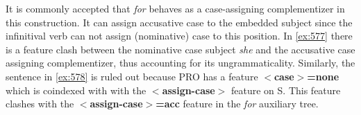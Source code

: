 It is commonly accepted that {\it for\/} behaves as a case-assigning 
complementizer in this construction. It can assign accusative case to the 
embedded subject since the infinitival verb can not assign 
(nominative) case to this position.  
In \ref{ex:577} there is a feature clash between the nominative case subject {\it she} and the accusative case assigning complementizer, thus accounting for its 
ungrammaticality. Similarly, the sentence in \ref{ex:578} is ruled out because PRO 
has a feature {\bf $<$case$>$=none} which is coindexed with with the {\bf $<$assign-case$>$} feature on S. This feature clashes with the {\bf $<$assign-case$>$=acc} feature in the {\it for} auxiliary tree. 
 
 
